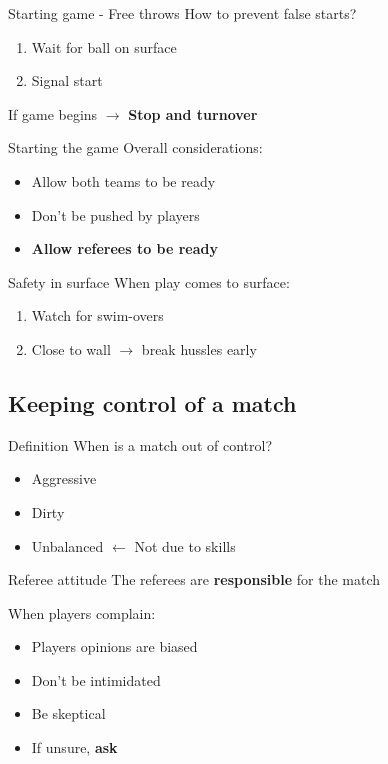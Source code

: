 \documentclass{beamer}
\begin{document}
	\begin{frame}{Starting game - Free throws}
		How to prevent false starts?
		\begin{enumerate}
			\item Wait for ball on surface
			\item Signal start
		\end{enumerate}

		\pause

		If game begins $\rightarrow$ \textbf{Stop and turnover}
	\end{frame}

	\begin{frame}{Starting the game}
		Overall considerations:
		\begin{itemize}
			\item Allow both teams to be ready
			\item Don't be pushed by players
			\item \textbf{Allow referees to be ready}
		\end{itemize}
	\end{frame}

	\begin{frame}{Safety in surface}
		When play comes to surface:
		\begin{enumerate}
			\item Watch for swim-overs
			\item Close to wall $\rightarrow$ break hussles early
		\end{enumerate}
	\end{frame}

	\subsection{Keeping control of a match}

	\begin{frame}{Definition}
		When is a match out of control?

		\pause

		\begin{itemize}
			\item Aggressive
			\item Dirty
			\item Unbalanced $\leftarrow$ Not due to skills
		\end{itemize}
	\end{frame}

	\begin{frame}{Referee attitude}
		The referees are \textbf{responsible} for the match

		When players complain:
		\begin{itemize}
			\item Players opinions are biased
			\item Don't be intimidated
			\item Be skeptical
			\item If unsure, \textbf{ask}
		\end{itemize}
	\end{frame}
\end{document}
